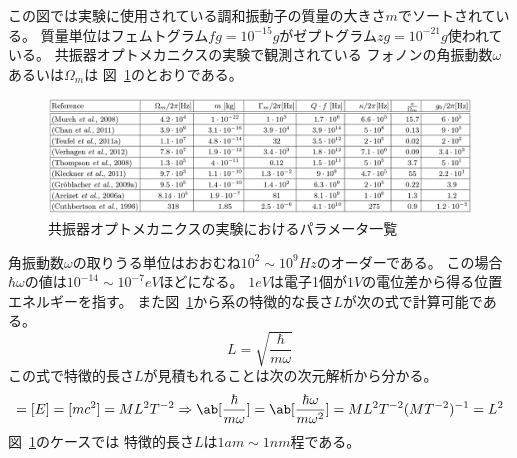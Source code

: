 この図では実験に使用されている調和振動子の質量の大きさ$m$でソートされている。
質量単位はフェムトグラム$\si{fg}=10^{-15}\si{g}$がゼプトグラム$\si{zg}=10^{-21}\si{g}$使われている。
共振器オプトメカニクスの実験で観測されている
フォノンの角振動数$\omega$あるいは$\Omega_m$は
図~\ref{fig:cavity_optomechanics_example_table}のとおりである。
\begin{figure}[tbp]
  \begin{center}
    \includegraphics[width=15cm]{img/cavity_optomechanics_example_table.png}
    \caption{共振器オプトメカニクスの実験におけるパラメータ一覧~\cite{aspelmeyer2014cavity}}\label{fig:cavity_optomechanics_example_table}
  \end{center}
\end{figure}
角振動数$\omega$の取りうる単位はおおむね$10^2\sim10^9\si{Hz}$のオーダーである。
この場合$\hbar\omega$の値は$10^{-14}\sim10^{-7}\si{eV}$ほどになる。
$1\si{eV}$は電子1個が$1\si{V}$の電位差から得る位置エネルギーを指す。
また図~\ref{fig:cavity_optomechanics_example_table}から系の特徴的な長さ$L$が次の式で計算可能である。
\begin{equation}
  \label{eq:L_estimate}
  L=\sqrt{\frac{\hbar}{m\omega}}
  \tag{9.3}
\end{equation}
この式で特徴的長さ$L$が見積もれることは次の次元解析から分かる。
\begin{equation}
  [\hbar\omega]=[E]=[mc^2]=ML^2T^{-2}
  \Rightarrow
  \ab[\frac{\hbar}{m\omega}]
  =\ab[\frac{\hbar\omega}{m\omega^2}]
  = ML^2T^{-2}(MT^{-2})^{-1}=L^2
\end{equation}
図~\ref{fig:cavity_optomechanics_example_table}のケースでは
特徴的長さ$L$は$1\si{am}\sim1\si{nm}$程である。

